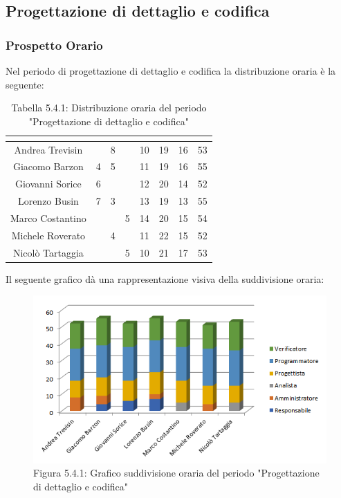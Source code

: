\subsection{Progettazione di dettaglio e codifica}

\subsubsection{Prospetto Orario}
Nel periodo di progettazione di dettaglio e codifica la distribuzione oraria è la seguente:

\renewcommand{\arraystretch}{1.5}
\begin{table}[H]
\begin{center}
\begin{tabular}{|c|c|c|c|c|c|c|c|}
\hline
\rowcolor{title_row}
\textbf{\color{title_text}{Nome}} & \textbf{\color{title_text}{Resp.}} & \textbf{\color{title_text}{Ammi.}} & \textbf{\color{title_text}{Analist.}} & \textbf{\color{title_text}{Progett.}} & \textbf{\color{title_text}{Program.}} & \textbf{\color{title_text}{Verific.}} & \textbf{\color{title_text}{Totale}} \\ \hline
Andrea Trevisin  & & 8 & & 10 & 19 & 16 & 53  \\ \hline
Giacomo Barzon   & 4 & 5 & & 11 & 19 & 16 & 55 \\ \hline
Giovanni Sorice  & 6 & & & 12 & 20 & 14 & 52  \\ \hline
Lorenzo Busin    & 7 & 3 & & 13 & 19 & 13 & 55  \\ \hline
Marco Costantino & & & 5 & 14 & 20 & 15 & 54 \\ \hline
Michele Roverato & & 4 & & 11 & 22 & 15 & 52  \\ \hline
Nicolò Tartaggia & & & 5 & 10 & 21 & 17 & 53  \\ \hline
\end{tabular}
\caption{Tabella 5.4.1: Distribuzione oraria del periodo "Progettazione di dettaglio e codifica"\label{}}
\end{center}
\end{table}
\renewcommand{\arraystretch}{1}

Il seguente grafico dà una rappresentazione visiva della suddivisione oraria: \\
\begin{figure} [H]
	\centering
	\includegraphics[scale=1]{Res/ExcelGrafici/Grafici/CodificaOre.png}
	\caption{Figura 5.4.1: Grafico suddivisione oraria del periodo "Progettazione di dettaglio e codifica"}\label{}
\end{figure}



